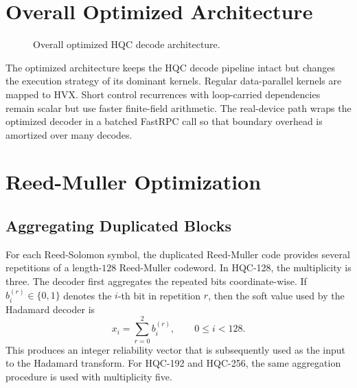 \documentclass[12pt,a4paper]{report}
\begin{document}
\section{Overall Optimized Architecture}
\begin{figure}[h]
\centering
{}
\caption{Overall optimized HQC decode architecture.}
\label{fig:optimized-architecture}
\end{figure}

The optimized architecture keeps the HQC decode pipeline intact but changes the execution strategy of its dominant kernels. Regular data-parallel kernels are mapped to HVX. Short control recurrences with loop-carried dependencies remain scalar but use faster finite-field arithmetic. The real-device path wraps the optimized decoder in a batched FastRPC call so that boundary overhead is amortized over many decodes.

\section{Reed-Muller Optimization}
\subsection{Aggregating Duplicated Blocks}
For each Reed-Solomon symbol, the duplicated Reed-Muller code provides several repetitions of a length-$128$ Reed-Muller codeword. In HQC-128, the multiplicity is three. The decoder first aggregates the repeated bits coordinate-wise. If $b_i^{(r)}\in\{0,1\}$ denotes the $i$-th bit in repetition $r$, then the soft value used by the Hadamard decoder is
\[
    x_i=\sum_{r=0}^{2} b_i^{(r)}, \qquad 0\le i<128.
\]
This produces an integer reliability vector that is subsequently used as the input to the Hadamard transform. For HQC-192 and HQC-256, the same aggregation
procedure is used with multiplicity five.
\end{document}
